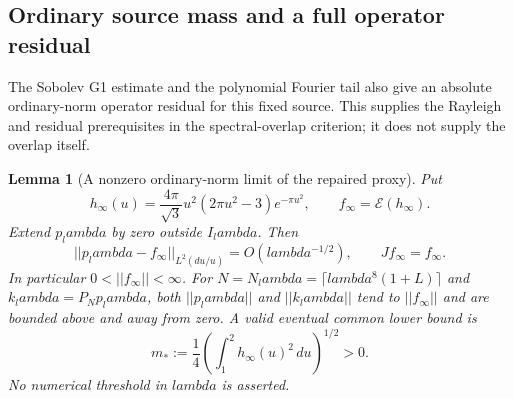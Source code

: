 \documentclass[11pt]{article}
\def\lambda{lambda}%
\def\norm#1{||#1||}%
\newtheorem{lemma}[theorem]{Lemma}
\theoremstyle{remark}
\newcommand{\norm}[1]{\left\lVert #1\right\rVert}
\begin{document}
\subsection{Ordinary source mass and a full operator residual}
The Sobolev G1 estimate and the polynomial Fourier tail also give an
absolute ordinary-norm operator residual for this fixed source. This supplies the
Rayleigh and residual prerequisites in the spectral-overlap criterion;
it does not supply the overlap itself.

\begin{lemma}[A nonzero ordinary-norm limit of the repaired proxy]
\label{lem:v115-source-mass}
Put
\[
 h_\infty(u)=\frac{4\pi}{\sqrt3}u^2(2\pi u^2-3)e^{-\pi u^2},
 \qquad f_\infty=\mathcal E(h_\infty).
\]
Extend $p_\lambda$ by zero outside $I_\lambda$. Then
\begin{equation}\label{eq:v115-source-limit}
 \norm{p_\lambda-f_\infty}_{L^2(du/u)}=O(\lambda^{-1/2}),
 \qquad Jf_\infty=f_\infty.
\end{equation}
In particular $0<\norm{f_\infty}<\infty$. For
$N=N_\lambda=\lceil\lambda^8(1+L)\rceil$ and
$k_\lambda=P_Np_\lambda$, both $\norm{p_\lambda}$ and
$\norm{k_\lambda}$ tend to $\norm{f_\infty}$ and are bounded above
and away from zero. A valid eventual common lower bound is
\begin{equation}\label{eq:v115-mass-lower}
 m_*:=\frac14\left(\int_1^2h_\infty(u)^2\,du\right)^{1/2}>0.
\end{equation}
No numerical threshold in $\lambda$ is asserted.
\end{lemma}
\end{document}
